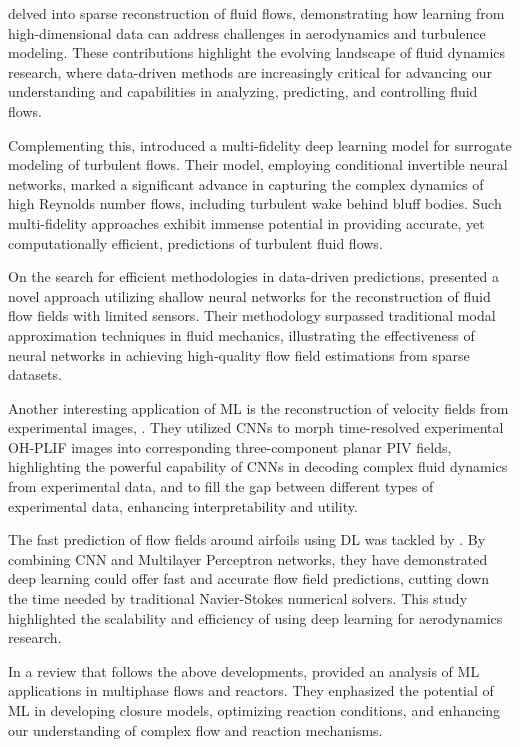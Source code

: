 \cite{Jayaraman2019a, Zhu2019} delved into sparse reconstruction of fluid flows, demonstrating how learning from high-dimensional data can address challenges in aerodynamics and turbulence modeling. These contributions highlight the evolving landscape of fluid dynamics research, where data-driven methods are increasingly critical for advancing our understanding and capabilities in analyzing, predicting, and controlling fluid flows.

Complementing this, \citet{Geneva2020c} introduced a multi-fidelity deep learning model for surrogate modeling of turbulent flows. Their model, employing conditional invertible neural networks, marked a significant advance in capturing the complex dynamics of high Reynolds number flows, including turbulent wake behind bluff bodies. Such multi-fidelity approaches exhibit immense potential in providing accurate, yet computationally efficient, predictions of turbulent fluid flows.

On the search for efficient methodologies in data-driven predictions,\citet{Erichson2020b} presented a novel approach utilizing shallow neural networks for the reconstruction of fluid flow fields with limited sensors. Their methodology surpassed traditional modal approximation techniques in fluid mechanics, illustrating the effectiveness of neural networks in achieving high-quality flow field estimations from sparse datasets.

Another interesting application of ML is the reconstruction of velocity fields from experimental images, \cite{Barwey2022c}. They utilized CNNs to morph time-resolved experimental OH-PLIF images into corresponding three-component planar PIV fields, highlighting the powerful capability of CNNs in decoding complex fluid dynamics from experimental data, and to fill the gap between different types of experimental data, enhancing interpretability and utility.

The fast prediction of flow fields around airfoils using DL was tackled by \citet{Sekar2019}. By combining CNN and Multilayer Perceptron networks, they have demonstrated deep learning could offer fast and accurate flow field predictions, cutting down the time needed by traditional Navier-Stokes numerical solvers. This study highlighted the scalability and efficiency of using deep learning for aerodynamics research.

In a review that follows the above developments, \citet{Zhu2022a} provided an analysis of ML applications in multiphase flows and reactors. They enphasized the potential of ML in developing closure models, optimizing reaction conditions, and enhancing our understanding of complex flow and reaction mechanisms.

